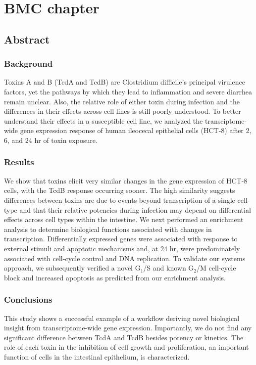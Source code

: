 \chapter{ BMC chapter }

\section{Abstract}

\subsection{Background}
Toxins A and B (TcdA and TcdB) are Clostridium difficile’s principal virulence factors, yet the pathways by which they lead to inflammation and severe diarrhea remain unclear. Also, the relative role of either toxin during infection and the differences in their effects across cell lines is still poorly understood. To better understand their effects in a susceptible cell line, we analyzed the transciptome-wide gene expression response of human ileocecal epithelial cells (HCT-8) after 2, 6, and 24 hr of toxin exposure. 

\subsection{Results}
We show that toxins elicit very similar changes in the gene expression of HCT-8 cells, with the TcdB response occurring sooner. The high similarity suggests differences between toxins are due to events beyond transcription of a single cell-type and that their relative potencies during infection may depend on differential effects across cell types within the intestine. We next performed an enrichment analysis to determine biological functions associated with changes in transcription. Differentially expressed genes were associated with response to external stimuli and apoptotic mechanisms and, at 24 hr, were predominately associated with cell-cycle control and DNA replication. To validate our systems approach, we subsequently verified a novel G$_{\text{1}}$/S and known G$_{\text{2}}$/M cell-cycle block and increased apoptosis as predicted from our enrichment analysis. 

\subsection{Conclusions}
This study shows a successful example of a workflow deriving novel biological insight from transcriptome-wide gene expression. Importantly, we do not find any significant difference between TcdA and TcdB besides potency or kinetics. The role of each toxin in the inhibition of cell growth and proliferation, an important function of cells in the intestinal epithelium, is characterized.

